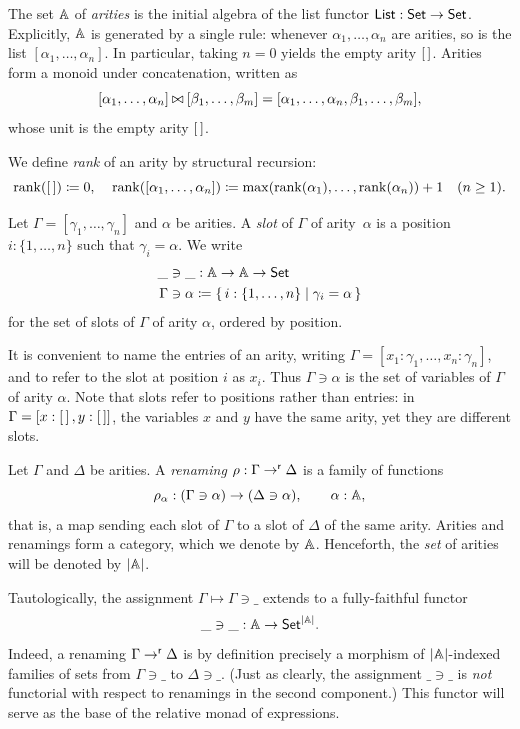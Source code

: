 \begin{definition}\label{def:arities}
    The set $\mathbb{A}$ of \emph{arities} is the initial algebra of the list functor $\mathsf{List} : \mathsf{Set} \to \mathsf{Set}$. Explicitly, $\mathbb{A}$ is generated by a single rule: whenever $\alpha_1, \ldots, \alpha_n$ are arities, so is the list $[\alpha_1, \ldots, \alpha_n]$. In particular, taking $n = 0$ yields the empty arity $\left[\,\right]$. Arities form a monoid under concatenation, written as
    \[
    [\alpha_1, \ldots, \alpha_n] \mathbin{\bowtie} [\beta_1, \ldots, \beta_m] = [\alpha_1, \ldots, \alpha_n, \beta_1, \ldots, \beta_m],
    \]
    whose unit is the empty arity $\left[\,\right]$.

    We define \emph{rank} of an arity by structural recursion:
    \[
    \operatorname{rank}(\left[\,\right]) \coloneqq 0,\;\;\;\; \operatorname{rank}([\alpha_1, \ldots, \alpha_n]) \coloneqq \max(\operatorname{rank}(\alpha_1), \ldots, \operatorname{rank}(\alpha_n)) + 1 \quad (n \geq 1).
    \]

    Let $\Gamma = [\gamma_1, \ldots, \gamma_n]$ and $\alpha$ be arities. A \emph{slot} of $\Gamma$ of arity~$\alpha$ is a position $i : \{1, \ldots, n\}$ such that $\gamma_i = \alpha$. We write
    \begin{align*}
        \_ &\ni \_ : \mathbb{A} \to \mathbb{A} \to \mathsf{Set}\\
        \Gamma &\ni \alpha \coloneqq \{\, i : \{1, \ldots, n\} \mid \gamma_i = \alpha \,\}
    \end{align*}
    for the set of slots of $\Gamma$ of arity $\alpha$, ordered by position.

    It is convenient to name the entries of an arity, writing $\Gamma = [x_1 : \gamma_1, \ldots, x_n : \gamma_n]$, and to refer to the slot at position $i$ as $x_i$. Thus $\Gamma \ni \alpha$ is the set of variables of $\Gamma$ of arity $\alpha$. Note that slots refer to positions rather than entries: in $\Gamma = [x : \left[\,\right], y : \left[\,\right]]$, the variables $x$ and $y$ have the same arity, yet they are different slots.

    Let $\Gamma$ and $\Delta$ be arities. A \emph{renaming} $\rho : \Gamma \to^{\mathsf{r}} \Delta$ is a family of functions
    \[
    \rho_\alpha : (\Gamma \ni \alpha) \to (\Delta \ni \alpha), \qquad \alpha : \mathbb{A},
    \]
    that is, a map sending each slot of $\Gamma$ to a slot of $\Delta$ of the same arity. Arities and renamings form a category, which we denote by $\mathbb{A}$. Henceforth, the \emph{set} of arities will be denoted by $\left|\mathbb{A}\right|$.

    Tautologically, the assignment $\Gamma \mapsto \Gamma \ni \_$ extends to a fully-faithful functor
    \[
    \_ \ni \_ : \mathbb{A} \to \mathsf{Set}^{\left|\mathbb{A}\right|}.
    \]
    Indeed, a renaming $\Gamma \to^{\mathsf{r}} \Delta$ is by definition precisely a morphism of $\left|\mathbb{A}\right|$-indexed families of sets from $\Gamma \ni \_$ to $\Delta \ni \_$. (Just as clearly, the assignment $\_ \ni \_$ is \emph{not} functorial with respect to renamings in the second component.) This functor will serve as the base of the relative monad of expressions.
\end{definition}

